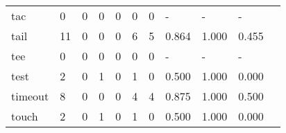 \begin{longtable}{lp{1.2cm}p{1.2cm}p{1.2cm}p{1.2cm}p{1.2cm}p{1.2cm}p{1.2cm}p{1.2cm}p{1.2cm}p{1.2cm}}
tac       &                                     0 &                                                  0 &                                                  0 &                                                  0 &                                                  0 &                                                  0 &                                                  - &                                                  - &                                                  - \\
tail      &                                    11 &                                                  0 &                                                  0 &                                                  0 &                                                  6 &                                                  5 &                                              0.864 &                                              1.000 &                                              0.455 \\
tee       &                                     0 &                                                  0 &                                                  0 &                                                  0 &                                                  0 &                                                  0 &                                                  - &                                                  - &                                                  - \\
test      &                                     2 &                                                  0 &                                                  1 &                                                  0 &                                                  1 &                                                  0 &                                              0.500 &                                              1.000 &                                              0.000 \\
timeout   &                                     8 &                                                  0 &                                                  0 &                                                  0 &                                                  4 &                                                  4 &                                              0.875 &                                              1.000 &                                              0.500 \\
touch     &                                     2 &                                                  0 &                                                  1 &                                                  0 &                                                  1 &                                                  0 &                                              0.500 &                                              1.000 &                                              0.000 \\

\end{longtable}
